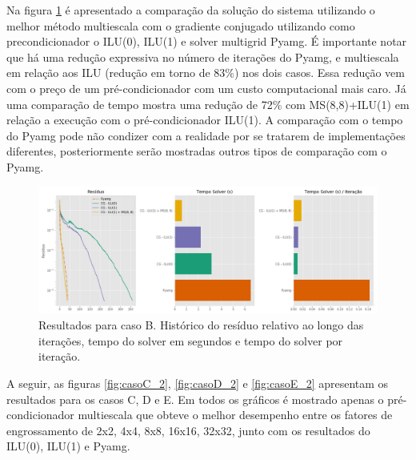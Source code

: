 Na figura \ref{fig:reservatorio320x320_2} é apresentado a comparação da solução do sistema utilizando o melhor método multiescala com o gradiente conjugado utilizando como precondicionador o ILU(0), ILU(1) e solver multigrid Pyamg. É importante notar que há uma redução expressiva no número de iterações do Pyamg, e multiescala em relação aos ILU (redução em torno de 83\%) nos dois casos. Essa redução vem com o preço de um pré-condicionador com um custo computacional mais caro. Já uma comparação de tempo mostra uma redução de 72\% com MS(8,8)+ILU(1) em relação a execução com o pré-condicionador ILU(1). A comparação com o tempo do Pyamg pode não condizer com a realidade por se tratarem de implementações diferentes, posteriormente serão mostradas outros tipos de comparação com o Pyamg.




\begin{figure}[!htbp]
\centering
\includegraphics[width=\textwidth]{chap08/figs/reservatorio320x320_2.png}
\caption{Resultados para caso B. Histórico do resíduo relativo ao longo das iterações, tempo do solver em segundos e tempo do solver por iteração. }
\label{fig:reservatorio320x320_2}
\end{figure}


A seguir, as figuras \ref{fig:casoC_2}, \ref{fig:casoD_2} e \ref{fig:casoE_2} apresentam os resultados para os casos C, D e E. 
Em todos os gráficos é mostrado apenas o pré-condicionador multiescala que obteve o melhor desempenho entre os fatores de engrossamento de 2x2, 4x4, 8x8, 16x16, 32x32,  junto com os resultados do ILU(0), ILU(1) e Pyamg.




